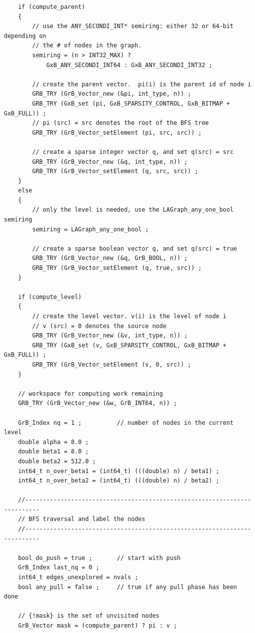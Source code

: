 \begin{verbatim}
    if (compute_parent)
    {
        // use the ANY_SECONDI_INT* semiring: either 32 or 64-bit depending on
        // the # of nodes in the graph.
        semiring = (n > INT32_MAX) ?
            GxB_ANY_SECONDI_INT64 : GxB_ANY_SECONDI_INT32 ;

        // create the parent vector.  pi(i) is the parent id of node i
        GRB_TRY (GrB_Vector_new (&pi, int_type, n)) ;
        GRB_TRY (GxB_set (pi, GxB_SPARSITY_CONTROL, GxB_BITMAP + GxB_FULL)) ;
        // pi (src) = src denotes the root of the BFS tree
        GRB_TRY (GrB_Vector_setElement (pi, src, src)) ;

        // create a sparse integer vector q, and set q(src) = src
        GRB_TRY (GrB_Vector_new (&q, int_type, n)) ;
        GRB_TRY (GrB_Vector_setElement (q, src, src)) ;
    }
    else
    {
        // only the level is needed, use the LAGraph_any_one_bool semiring
        semiring = LAGraph_any_one_bool ;

        // create a sparse boolean vector q, and set q(src) = true
        GRB_TRY (GrB_Vector_new (&q, GrB_BOOL, n)) ;
        GRB_TRY (GrB_Vector_setElement (q, true, src)) ;
    }

    if (compute_level)
    {
        // create the level vector. v(i) is the level of node i
        // v (src) = 0 denotes the source node
        GRB_TRY (GrB_Vector_new (&v, int_type, n)) ;
        GRB_TRY (GxB_set (v, GxB_SPARSITY_CONTROL, GxB_BITMAP + GxB_FULL)) ;
        GRB_TRY (GrB_Vector_setElement (v, 0, src)) ;
    }

    // workspace for computing work remaining
    GRB_TRY (GrB_Vector_new (&w, GrB_INT64, n)) ;

    GrB_Index nq = 1 ;          // number of nodes in the current level
    double alpha = 8.0 ;
    double beta1 = 8.0 ;
    double beta2 = 512.0 ;
    int64_t n_over_beta1 = (int64_t) (((double) n) / beta1) ;
    int64_t n_over_beta2 = (int64_t) (((double) n) / beta2) ;

    //--------------------------------------------------------------------------
    // BFS traversal and label the nodes
    //--------------------------------------------------------------------------

    bool do_push = true ;       // start with push
    GrB_Index last_nq = 0 ;
    int64_t edges_unexplored = nvals ;
    bool any_pull = false ;     // true if any pull phase has been done

    // {!mask} is the set of unvisited nodes
    GrB_Vector mask = (compute_parent) ? pi : v ;


\end{verbatim}
